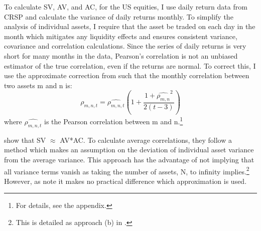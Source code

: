 To calculate SV, AV, and AC, for the US equities, I use daily return data from CRSP and calculate the variance of daily returns monthly. To simplify the analysis of individual assets, I require that the asset be traded on each day in the month which mitigates any liquidity effects and ensures consistent variance, covariance and correlation calculations. Since the series of daily returns is very short for many months in the data, Pearson’s correlation is not an unbiased estimator of the true correlation, even if the returns are normal. \citep{hotelling_1953} To correct this, I use the approximate correction from \cite{olkin_1958} such that the monthly correlation between two assets m and n is:
\begin{equation}
\rho_{m,n,t} = \widehat{\rho_{m,n,t}}\left(1 + \frac{1+\widehat{\rho_{m,n}}^{2}}{2(t-3)}\right)
\end{equation}
where $\widehat{\rho_{m,n,t}}$ is the Pearson correlation between m and n.\footnote{For details, see the appendix.}

\citet{pollet_average_2010} show that SV $\approx$ AV*AC. To calculate average correlations, they follow a method which makes an assumption on the deviation of individual asset variance from the average variance. This approach has the advantage of not implying that all variance terms vanish as taking the number of assets, N, to infinity implies.\footnote{This is detailed as approach (b) in \citet{nematrian}.} However, as \citet{tierens_anadu} note it makes no practical difference which approximation is used.

